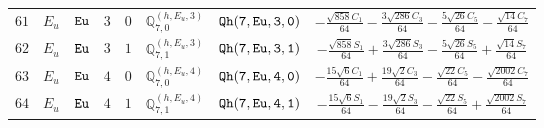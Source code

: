 \documentclass[fleqn,8pt]{jsarticle}
\begin{document}
\begin{table}[ht!]
\begin{center}
\begin{tabular}{cccccccc}
$ 61 $ & $ E_{u} $ & $ {\tt Eu} $ & $ 3 $ & $ 0 $ & $ \mathbb{Q}_{7,0}^{(h,E_{u},3)} $ & $ {\tt Qh(7,Eu,3,0)} $ & $ - \frac{\sqrt{858} C_{1}}{64} - \frac{3 \sqrt{286} C_{3}}{64} - \frac{5 \sqrt{26} C_{5}}{64} - \frac{\sqrt{14} C_{7}}{64} $ \\
$ 62 $ & $ E_{u} $ & $ {\tt Eu} $ & $ 3 $ & $ 1 $ & $ \mathbb{Q}_{7,1}^{(h,E_{u},3)} $ & $ {\tt Qh(7,Eu,3,1)} $ & $ - \frac{\sqrt{858} S_{1}}{64} + \frac{3 \sqrt{286} S_{3}}{64} - \frac{5 \sqrt{26} S_{5}}{64} + \frac{\sqrt{14} S_{7}}{64} $ \\
$ 63 $ & $ E_{u} $ & $ {\tt Eu} $ & $ 4 $ & $ 0 $ & $ \mathbb{Q}_{7,0}^{(h,E_{u},4)} $ & $ {\tt Qh(7,Eu,4,0)} $ & $ - \frac{15 \sqrt{6} C_{1}}{64} + \frac{19 \sqrt{2} C_{3}}{64} - \frac{\sqrt{22} C_{5}}{64} - \frac{\sqrt{2002} C_{7}}{64} $ \\
$ 64 $ & $ E_{u} $ & $ {\tt Eu} $ & $ 4 $ & $ 1 $ & $ \mathbb{Q}_{7,1}^{(h,E_{u},4)} $ & $ {\tt Qh(7,Eu,4,1)} $ & $ - \frac{15 \sqrt{6} S_{1}}{64} - \frac{19 \sqrt{2} S_{3}}{64} - \frac{\sqrt{22} S_{5}}{64} + \frac{\sqrt{2002} S_{7}}{64} $ \\
 \hline \hline
\end{tabular}
\end{center}
\end{table}
\end{document}
